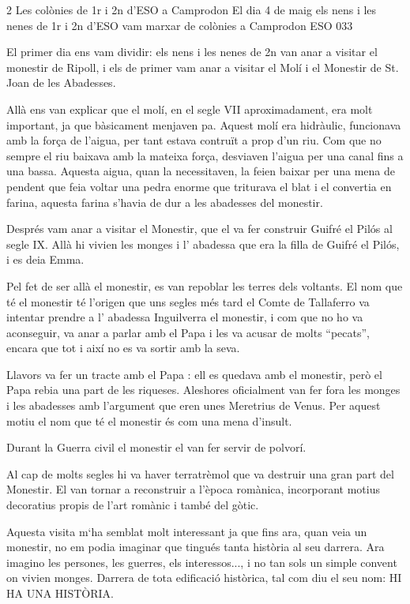 \begin{news}
{2} %
{Les colònies de 1r i 2n d'ESO a Camprodon}
{El dia 4 de maig els nens i les nenes de 1r i 2n d'ESO vam marxar de colònies a Camprodon}
{ESO}
{033} %



El primer dia ens vam dividir: els nens i les nenes de 2n van anar a visitar el monestir de Ripoll, i els de primer vam anar a visitar el Molí i el Monestir de St. Joan de les Abadesses.

Allà ens van explicar que el molí, en el segle VII aproximadament, era molt important, ja que bàsicament menjaven pa. Aquest molí era hidràulic,  funcionava amb la força de l'aigua, per tant estava contruït a prop d'un riu. Com que no sempre el riu baixava amb la mateixa força, desviaven l'aigua per una canal fins a una bassa. Aquesta aigua, quan la necessitaven, la feien baixar per una mena de pendent que feia voltar una pedra enorme que triturava el blat i el convertia en farina, aquesta farina s'havia de dur a les abadesses del monestir.

Després vam anar a visitar el Monestir, que el va fer construir Guifré el Pilós al segle IX. Allà hi vivien les monges i l' abadessa que era la filla de Guifré el Pilós, i es deia Emma.  

Pel fet de ser allà el monestir, es van repoblar les  terres dels voltants.
 El nom que té el monestir té l'origen  que uns segles més tard el Comte de Tallaferro va intentar prendre a l' abadessa Inguilverra el monestir, i com que no ho va aconseguir, va anar a parlar amb el Papa i les va acusar de molts “pecats”, encara que tot i així no es  va sortir amb la seva.

Llavors va fer un tracte amb el Papa : ell es quedava amb el monestir,  però el Papa rebia una part de les riqueses. Aleshores oficialment van fer fora   les monges i  les abadesses amb l'argument que  eren unes Meretrius de Venus. Per aquest motiu el nom que té el monestir és com una mena d'insult. 

Durant la Guerra civil el monestir el van fer servir de polvorí. 

Al cap de molts segles hi va haver terratrèmol que va destruir una gran part del Monestir. 
El van tornar a reconstruir a l'època romànica, incorporant motius decoratius propis de l'art romànic i també del gòtic.

Aquesta visita m`ha semblat molt interessant ja que fins ara, quan veia un monestir, no em podia imaginar que tingués tanta història al seu darrera. Ara imagino les persones, les guerres, els interessos..., i no tan sols un simple convent on vivien monges. Darrera de tota edificació històrica, tal com diu el seu nom: HI HA UNA HISTÒRIA.



\end{news}

